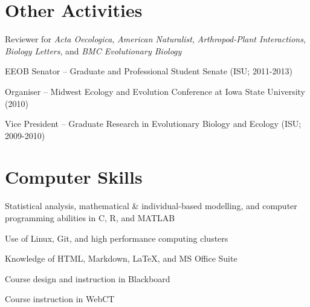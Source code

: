 \documentclass[letterpaper]{article}
\renewenvironment{itemize}{
  \begin{list}{}{
    \setlength{\leftmargin}{1.5em}
  }
}{
  \end{list}
}
\begin{document}
\section*{Other Activities}
\begin{itemize}
\item Reviewer for {\it Acta Oecologica}, {\it American Naturalist}, {\it Arthropod-Plant Interactions}, {\it Biology Letters}, and {\it BMC Evolutionary Biology}
\item EEOB Senator -- Graduate and Professional Student Senate (ISU; 2011-2013)
\item Organiser -- Midwest Ecology and Evolution Conference at Iowa State University (2010)
\item Vice President -- Graduate Research in Evolutionary Biology and Ecology (ISU; 2009-2010)
\end{itemize}

\section*{Computer Skills}
\begin{itemize}
\item Statistical analysis, mathematical \& individual-based modelling, and computer programming abilities in C, R, and MATLAB
\item Use of Linux, Git, and high performance computing clusters
\item Knowledge of HTML, Markdown, \LaTeX, and MS Office Suite
\item Course design and instruction in Blackboard
\item Course instruction in WebCT
\end{itemize}
\end{document}
